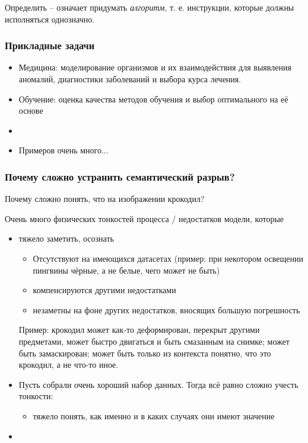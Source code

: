 \documentclass[main.tex]{subfiles}
\begin{document}
Определить -- означает придумать \emph{алгоритм}, т. е. инструкции, которые должны исполняться однозначно.

\subsubsection{Прикладные задачи}
\begin{itemize}[noitemsep]
    \item Медицина: моделирование организмов и их взаимодействия для выявления аномалий, диагностики заболеваний и выбора курса лечения.
    \item Обучение: оценка качества методов обучения и выбор оптимального на её основе
    \item %
    \item Примеров очень много...
\end{itemize}

\subsubsection{Почему сложно устранить семантический разрыв?}
Почему сложно понять, что на изображении крокодил?

Очень много физических тонкостей процесса / недостатков модели, которые
\begin{itemize}[noitemsep]
    \item тяжело заметить, осознать
    \begin{itemize}[noitemsep]
        \item Отсутствуют на имеющихся датасетах (пример: при некотором освещении пингвины чёрные, а не белые, чего может не быть) %
        \item компенсируются другими недостатками
        \item незаметны на фоне других недостатков, вносящих большую погрешность
    \end{itemize}
    Пример: крокодил может как-то деформирован, перекрыт другими предметами, может быстро двигаться и быть смазанным на снимке; может быть замаскирован; может быть только из контекста понятно, что это крокодил, а не что-то иное.
    \item Пусть собрали очень хороший набор данных. Тогда всё равно сложно учесть тонкости:
       \begin{itemize}[noitemsep]
           \item тяжело понять, как именно и в каких случаях они имеют значение
       \end{itemize}
   \item
\end{itemize}
\end{document}

